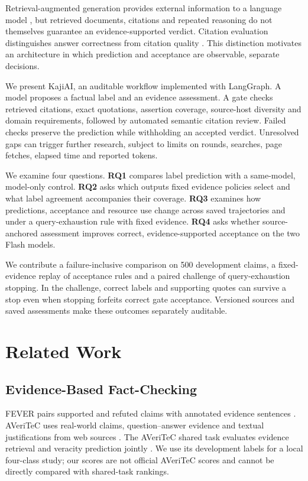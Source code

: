 \documentclass[conference]{IEEEtran}
\begin{document}
Retrieval-augmented generation provides external information to a language model \cite{rag}, but retrieved documents, citations and repeated reasoning do not themselves guarantee an evidence-supported verdict. Citation evaluation distinguishes answer correctness from citation quality \cite{alce}. This distinction motivates an architecture in which prediction and acceptance are observable, separate decisions.

We present KajiAI, an auditable workflow implemented with LangGraph. A model proposes a factual label and an evidence assessment. A gate checks retrieved citations, exact quotations, assertion coverage, source-host diversity and domain requirements, followed by automated semantic citation review. Failed checks preserve the prediction while withholding an accepted verdict. Unresolved gaps can trigger further research, subject to limits on rounds, searches, page fetches, elapsed time and reported tokens.

We examine four questions. \textbf{RQ1} compares label prediction with a same-model, model-only control. \textbf{RQ2} asks which outputs fixed evidence policies select and what label agreement accompanies their coverage. \textbf{RQ3} examines how predictions, acceptance and resource use change across saved trajectories and under a query-exhaustion rule with fixed evidence. \textbf{RQ4} asks whether source-anchored assessment improves correct, evidence-supported acceptance on the two Flash models.

We contribute a failure-inclusive comparison on 500 development claims, a fixed-evidence replay of acceptance rules and a paired challenge of query-exhaustion stopping. In the challenge, correct labels and supporting quotes can survive a stop even when stopping forfeits correct gate acceptance. Versioned sources and saved assessments make these outcomes separately auditable.

\section{Related Work}
\subsection{Evidence-Based Fact-Checking}
FEVER pairs supported and refuted claims with annotated evidence sentences \cite{fever}. AVeriTeC uses real-world claims, question--answer evidence and textual justifications from web sources \cite{averitec}. The AVeriTeC shared task evaluates evidence retrieval and veracity prediction jointly \cite{sharedtask}. We use its development labels for a local four-class study; our scores are not official AVeriTeC scores and cannot be directly compared with shared-task rankings.
\end{document}
